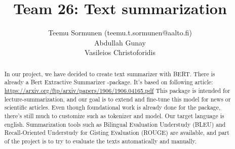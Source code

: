 \documentclass{article}
\title{Team 26: Text summarization}
\author{Teemu Sormunen (teemu.t.sormunen@aalto.fi)\\
	Abdullah Gunay\\
	Vasileios Christoforidis\\
}
\begin{document}
	
\maketitle

\begin{abstract}
\noindent
	In our project, we have decided to create text summarizer with BERT. 
	There is already a Bert Extractive Summarizer -package. It's based on following article: \href{https://arxiv.org/ftp/arxiv/papers/1906/1906.04165.pdf}{https://arxiv.org/ftp/arxiv/papers/1906/1906.04165.pdf}
	This package is intended for lecture-summarization, and our goal is to extend and fine-tune this model for news or scientific articles.
	Even though foundational work is already done for the package, there's still much to customize such as tokenizer and model. 
	Our target language is english. Summarization tools such as Bilingual Evaluation Understudy (BLEU) and Recall-Oriented Understudy for Gisting Evaluation (ROUGE) are available, and part of the project is to try to evaluate the texts automatically and manually.	
\end{abstract}	
\end{document}
